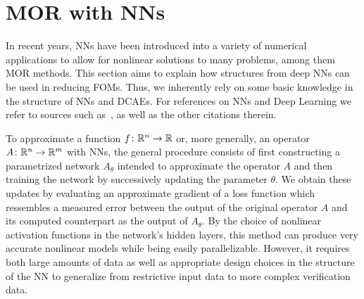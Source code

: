 \section{MOR with \aclp{NN}}\label{sec:nn-mor}

In recent years, \acp{NN} have been introduced into a variety of numerical applications to allow for nonlinear solutions to many problems, among them \ac{MOR} methods.
This section aims to explain how structures from deep \acp{NN} can be used in reducing \acp{FOM}.
Thus, we inherently rely on some basic knowledge in the structure of \acp{NN} and \acp{DCAE}.
For references on \acp{NN} and Deep Learning we refer to sources such as~\cite{Goodfellow2016, Kubat2017, Sarker2021}, as well as the other citations therein.

To approximate a function $f \colon \mathbb{R}^n \to \mathbb{R}$ or, more generally, an operator $A \colon \mathbb{R}^n \to \mathbb{R}^m$ with \acp{NN}, the general procedure consists of first constructing a parametrized network $A_\theta$ intended to approximate the operator $A$ and then training the network by successively updating the parameter $\theta$.
We obtain these updates by evaluating an approximate gradient of a loss function which ressembles a measured error between the output of the original operator $A$ and its computed counterpart as the output of $A_\theta$.
By the choice of nonlinear activation functions in the network's hidden layers, this method can produce very accurate nonlinear models while being easily parallelizable.
However, it requires both large amounts of data as well as appropriate design choices in the structure of the \ac{NN} to generalize from restrictive input data to more complex verification data.

